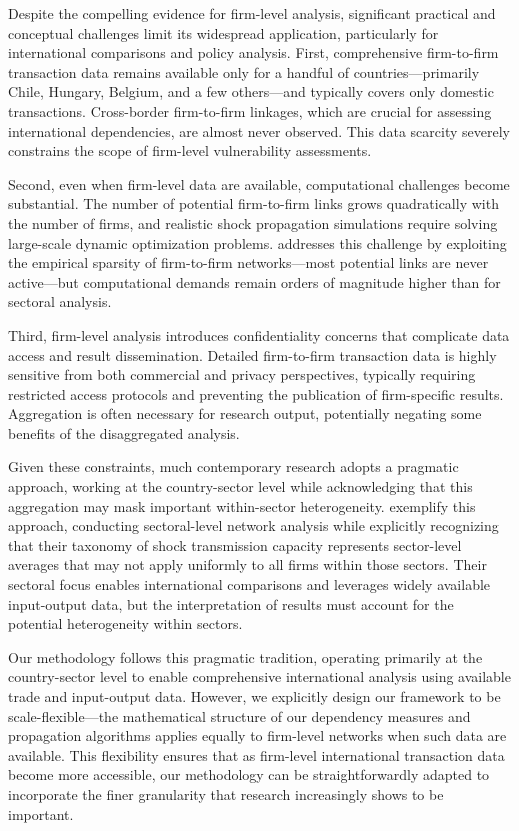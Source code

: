 \documentclass[final,1p,times,authoryear]{elsarticle}
\begin{document}
Despite the compelling evidence for firm-level analysis, significant practical and conceptual challenges limit its widespread application, particularly for international comparisons and policy analysis. First, comprehensive firm-to-firm transaction data remains available only for a handful of countries—primarily Chile, Hungary, Belgium, and a few others—and typically covers only domestic transactions. Cross-border firm-to-firm linkages, which are crucial for assessing international dependencies, are almost never observed. This data scarcity severely constrains the scope of firm-level vulnerability assessments.

Second, even when firm-level data are available, computational challenges become substantial. The number of potential firm-to-firm links grows quadratically with the number of firms, and realistic shock propagation simulations require solving large-scale dynamic optimization problems. \cite{Borsos2021} addresses this challenge by exploiting the empirical sparsity of firm-to-firm networks—most potential links are never active—but computational demands remain orders of magnitude higher than for sectoral analysis.

Third, firm-level analysis introduces confidentiality concerns that complicate data access and result dissemination. Detailed firm-to-firm transaction data is highly sensitive from both commercial and privacy perspectives, typically requiring restricted access protocols and preventing the publication of firm-specific results. Aggregation is often necessary for research output, potentially negating some benefits of the disaggregated analysis.

Given these constraints, much contemporary research adopts a pragmatic approach, working at the country-sector level while acknowledging that this aggregation may mask important within-sector heterogeneity. \cite{Costa2022} exemplify this approach, conducting sectoral-level network analysis while explicitly recognizing that their taxonomy of shock transmission capacity represents sector-level averages that may not apply uniformly to all firms within those sectors. Their sectoral focus enables international comparisons and leverages widely available input-output data, but the interpretation of results must account for the potential heterogeneity within sectors.

Our methodology follows this pragmatic tradition, operating primarily at the country-sector level to enable comprehensive international analysis using available trade and input-output data. However, we explicitly design our framework to be scale-flexible—the mathematical structure of our dependency measures and propagation algorithms applies equally to firm-level networks when such data are available. This flexibility ensures that as firm-level international transaction data become more accessible, our methodology can be straightforwardly adapted to incorporate the finer granularity that research increasingly shows to be important.
\end{document}
